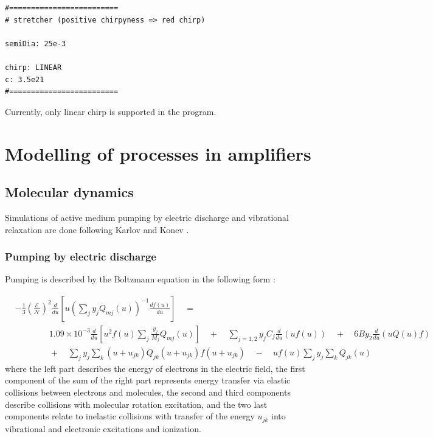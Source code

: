 \documentclass{report}
\begin{document}
\begin{verbatim}
#=========================
# stretcher (positive chirpyness => red chirp)

semiDia: 25e-3

chirp: LINEAR
c: 3.5e21
#=========================
\end{verbatim}

Currently, only linear chirp is supported in the program.


\chapter{Modelling of processes in \texorpdfstring{}{CO2} amplifiers}\label{chapter:models}

\section{Molecular dynamics}
Simulations of active medium pumping by electric discharge and vibrational relaxation are done following Karlov and Konev  \cite{Karlov-1978}.

\subsection{Pumping by electric discharge}
Pumping is described by the Boltzmann equation in the following form \cite{Holstein-1946,Nighan-1970}:

\begin{align}\label{eq:boltzmann}
&- \frac{1}{3} \left(\frac{\mathcal{E}}{\mathcal{N}}\right)^2 \frac{d}{du} \left[u \left( \sum\limits_j y_j Q_{mj}(u) \right)^{-1}\frac{df(u)}{du} \right] \quad = \nonumber \\
&\qquad \qquad 1.09 \times 10^{ - 3}\frac{d}{du}\left[ u^2 f(u)\sum\limits_j \frac{y_j}{M_j} Q_{mj}(u) \right]
\quad  + \quad \sum\limits_{j = 1,2} {y_j}{C_j} \frac{d}{du}(uf(u))
\quad  + \quad 6B y_2 \frac{d}{du}\left(uQ(u)f \right)\nonumber \\
&\qquad \qquad +\quad\sum\limits_j y_j \sum\limits_k (u + u_{jk})Q_{jk} (u + u_{jk})f(u + u_{jk}) \quad  - \quad uf(u)\sum\limits_j y_j \sum\limits_k Q_{jk}(u)
\end{align}
where the left part describes the energy of electrons in the electric field, the first component of the sum of the right part represents energy transfer via elastic collisions between electrons and molecules, the second and third components describe collisions with molecular rotation excitation, and the two last components relate to inelastic collisions with transfer of the energy $u_{jk}$ into vibrational and electronic excitations and ionization.
\end{document}
